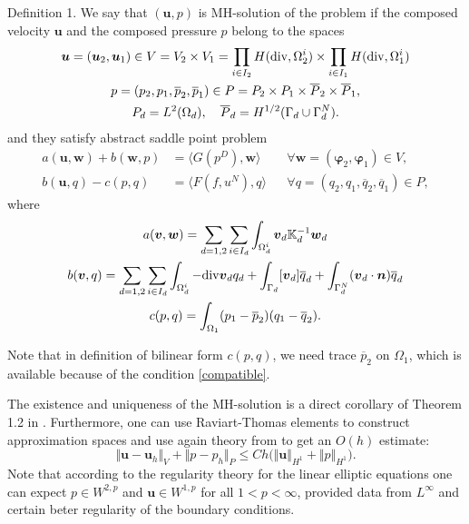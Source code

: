 \documentclass{elsart}
\def\div{{\rm div}}
\def\vc#1{\mathbf{\boldsymbol{#1}}}     %
\def\tn#1{{\mathbb{#1}}}    %
\def\norm#1{\bigl\Vert#1\bigr\Vert} %
\def\ol#1{\overline{#1}}
\def\vl{{\vc{u}}}
\def\phi{\varphi}
\begin{document}
\begin{thm}{Definition 1.}
We say that $(\vl,p)$ is MH-solution of the problem if the composed velocity $\vl$ and
the composed pressure $p$ belong to the spaces
\begin{gather}
	\label{Vspace}
	\vl=(\vl_2,\vl_1)\in V=V_2\times V_1=
		\prod_{i\in I_2} H(\div,\Omega_2^i)\times \prod_{i\in I_1} H(\div,\Omega_1^i)\\
	\label{Pspace}	
    p=(p_2,p_1,\ol{p}_2,\ol{p}_1)\in P=P_2\times P_1\times \ol{P}_2\times\ol{P}_1,\\
    \notag
    P_d=L^2(\Omega_d),\quad \ol{P}_d=H^{1/2}(\Gamma_d\cup\Gamma_d^N).
\end{gather}
and they satisfy abstract saddle point problem
\begin{align}
        \label{Saddle1}
 a(\vl,\vc w) + b(\vc w, p) &= \langle G(p^D), \vc w \rangle &&\forall \vc w=(\vc\phi_2,\vc\phi_1)\in V,\\
        \label{Saddle2}
 b(\vl, q) - c(p,q) &= \langle F(f,u^N), q \rangle &&\forall q=(q_2,q_1,\ol{q}_2,\ol{q}_1) \in P,
\end{align}
where
\begin{gather*}
 a(\vc v,\vc w)=\sum_{d=1,2}\sum_{i\in I_d} \int_{\Omega_d^i} \vc v_d \tn K_d^{-1} \vc w_d\\
 b(\vc v,q)=\sum_{d=1,2}\sum_{i\in I_d} \int_{\Omega_d^i} -\div\vc v_d q_d
 	+\int_{\Gamma_d} [\vc v_d]\ol{q}_d+\int_{\Gamma_d^N} (\vc v_d\cdot \vc n)\ol{q}_d\\
 c(p,q)=\int_{\Omega_1} (p_1-\ol{p}_2)(q_1-\ol{q}_2).
 \label{Cform}
\end{gather*}
\end{thm}
Note that in definition of bilinear form $c(p,q)$, we need trace $\ol{p}_2$ on $\Omega_1$,
which is available because of the condition \eqref{compatible}.

The existence and uniqueness of the MH-solution is a direct corollary of Theorem 1.2 in \cite{Brezzi}.
Furthermore, one can use Raviart-Thomas elements to construct approximation spaces and use again theory
from \cite{Brezzi} to get an $O(h)$ estimate:
\begin{equation}\label{CompatibleConvergence}
 \norm{\vl-\vl_h}_{V} + \norm{p-p_h}_{P} \le C h\big(\norm{\vl}_{H^1} + \norm{p}_{H^1}\big).
\end{equation}
Note that according to the regularity theory for the linear elliptic equations one can expect $p\in W^{2,p}$ and $\vl\in W^{1,p}$ for all $1<p<\infty$, provided data from $L^\infty$ and certain beter regularity of the boundary conditions.
\end{document}
